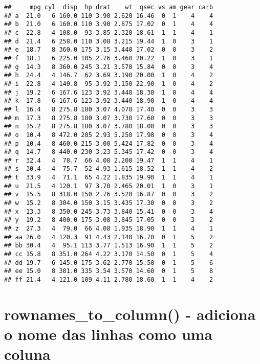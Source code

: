 \documentclass[]{book}
\newenvironment{Shaded}{\begin{snugshade}}{\end{snugshade}}
\newcommand{\DataTypeTok}[1]{\textcolor[rgb]{0.13,0.29,0.53}{#1}}
\newcommand{\KeywordTok}[1]{\textcolor[rgb]{0.13,0.29,0.53}{\textbf{#1}}}
\newcommand{\NormalTok}[1]{#1}
\newcommand{\OperatorTok}[1]{\textcolor[rgb]{0.81,0.36,0.00}{\textbf{#1}}}
\newcommand{\StringTok}[1]{\textcolor[rgb]{0.31,0.60,0.02}{#1}}
\begin{document}
\begin{verbatim}
##     mpg cyl  disp  hp drat    wt  qsec vs am gear carb
## a  21.0   6 160.0 110 3.90 2.620 16.46  0  1    4    4
## b  21.0   6 160.0 110 3.90 2.875 17.02  0  1    4    4
## c  22.8   4 108.0  93 3.85 2.320 18.61  1  1    4    1
## d  21.4   6 258.0 110 3.08 3.215 19.44  1  0    3    1
## e  18.7   8 360.0 175 3.15 3.440 17.02  0  0    3    2
## f  18.1   6 225.0 105 2.76 3.460 20.22  1  0    3    1
## g  14.3   8 360.0 245 3.21 3.570 15.84  0  0    3    4
## h  24.4   4 146.7  62 3.69 3.190 20.00  1  0    4    2
## i  22.8   4 140.8  95 3.92 3.150 22.90  1  0    4    2
## j  19.2   6 167.6 123 3.92 3.440 18.30  1  0    4    4
## k  17.8   6 167.6 123 3.92 3.440 18.90  1  0    4    4
## l  16.4   8 275.8 180 3.07 4.070 17.40  0  0    3    3
## m  17.3   8 275.8 180 3.07 3.730 17.60  0  0    3    3
## n  15.2   8 275.8 180 3.07 3.780 18.00  0  0    3    3
## o  10.4   8 472.0 205 2.93 5.250 17.98  0  0    3    4
## p  10.4   8 460.0 215 3.00 5.424 17.82  0  0    3    4
## q  14.7   8 440.0 230 3.23 5.345 17.42  0  0    3    4
## r  32.4   4  78.7  66 4.08 2.200 19.47  1  1    4    1
## s  30.4   4  75.7  52 4.93 1.615 18.52  1  1    4    2
## t  33.9   4  71.1  65 4.22 1.835 19.90  1  1    4    1
## u  21.5   4 120.1  97 3.70 2.465 20.01  1  0    3    1
## v  15.5   8 318.0 150 2.76 3.520 16.87  0  0    3    2
## w  15.2   8 304.0 150 3.15 3.435 17.30  0  0    3    2
## x  13.3   8 350.0 245 3.73 3.840 15.41  0  0    3    4
## y  19.2   8 400.0 175 3.08 3.845 17.05  0  0    3    2
## z  27.3   4  79.0  66 4.08 1.935 18.90  1  1    4    1
## aa 26.0   4 120.3  91 4.43 2.140 16.70  0  1    5    2
## bb 30.4   4  95.1 113 3.77 1.513 16.90  1  1    5    2
## cc 15.8   8 351.0 264 4.22 3.170 14.50  0  1    5    4
## dd 19.7   6 145.0 175 3.62 2.770 15.50  0  1    5    6
## ee 15.0   8 301.0 335 3.54 3.570 14.60  0  1    5    8
## ff 21.4   4 121.0 109 4.11 2.780 18.60  1  1    4    2
\end{verbatim}

\hypertarget{rownames_to_column---adiciona-o-nome-das-linhas-como-uma-coluna}{%
\section{rownames\_to\_column() - adiciona o nome das linhas como uma coluna}\label{rownames_to_column---adiciona-o-nome-das-linhas-como-uma-coluna}}

\begin{Shaded}
\end{Shaded}
\end{document}
